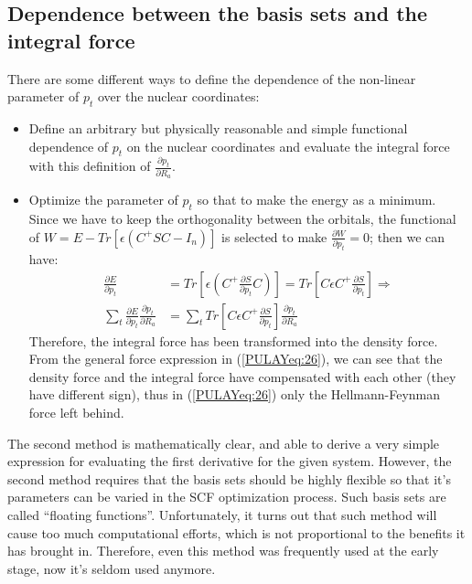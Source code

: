 \subsection{Dependence between the basis sets and the integral force}
%
%
There are some different ways to define the dependence of the
non-linear parameter of $p_{t}$ over the nuclear
coordinates\cite{Pulay5, meyer:2109}:
\begin{itemize}
\item Define an arbitrary but physically reasonable and simple
  functional dependence of $p_{t}$ on the nuclear coordinates and
  evaluate the integral force with this definition of $\frac{\partial
    p_{t}}{\partial R_{a}}$.
\item Optimize the parameter of $p_{t}$ so that to make the energy as
  a minimum. Since we have to keep the orthogonality between the
  orbitals, the functional of $W = E - Tr[\epsilon(C^{+}SC- I_{n})]$
  is selected to make $\frac{\partial W}{\partial p_{t}} = 0$; then we
  can have:
  \begin{align}\label{}
    \frac{\partial E}{\partial p_{t}} &=
    Tr\left[\epsilon\left(C^{+}\frac{\partial S}{\partial
          p_{t}}C\right)\right] =Tr\left[C\epsilon C^{+}\frac{\partial
        S}{\partial p_{t}}\right] \Rightarrow \nonumber \\
    \sum_{t}\frac{\partial E}{\partial p_{t}}\frac{\partial
      p_{t}}{\partial R_{a}} &=\sum_{t}Tr\left[C\epsilon
      C^{+}\frac{\partial S}{\partial p_{t}}\right]\frac{\partial
      p_{t}}{\partial R_{a}}
  \end{align}
  Therefore, the integral force has been transformed into the density
  force. From the general force expression in (\ref{PULAYeq:26}), we
  can see that the density force and the integral force have
  compensated with each other (they have different sign), thus in
  (\ref{PULAYeq:26}) only the Hellmann-Feynman force left behind.
\end{itemize}

The second method is mathematically clear, and able to derive a very
simple expression for evaluating the first derivative for the given
system. However, the second method requires that the basis sets should
be highly flexible so that it's parameters can be varied in the SCF
optimization process. Such basis sets are called ``floating
functions''\cite{Pulay5}. Unfortunately, it turns out that such method
will cause too much computational efforts, which is not proportional
to the benefits it has brought in. Therefore, even this method was
frequently used at the early stage, now it's seldom used anymore.

